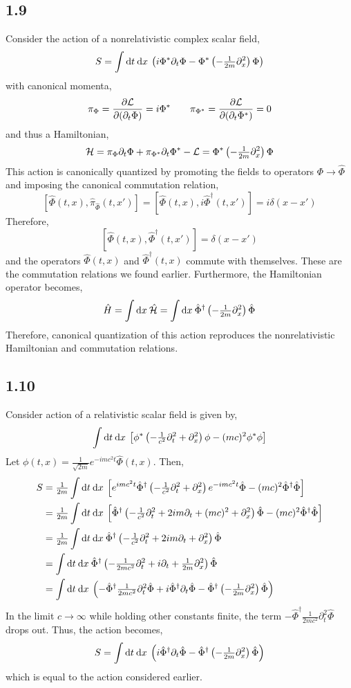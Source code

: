 \documentclass[12pt]{extarticle}
\newcommand{\field}{\hat{\Phi}}
\newcommand{\dfield}{\hat{\Phi}^\dagger}
\begin{document}
\subsection*{1.9}
Consider the action of a nonrelativistic complex scalar field,
\[ S = \int \mathrm{d}t \: \mathrm{d}x \: \left( i \Phi^* \partial_t \Phi - \Phi^* \left(-\tfrac{1}{2m} \partial_x^2 \right) \Phi \right) \] 
with canonical momenta,
\[ \pi_{\Phi} = \frac{\partial{\mathcal{L}}}{\partial{(\partial_t \Phi)}} = i \Phi^* \quad \quad \pi_{\Phi^*} = \frac{\partial{\mathcal{L}}}{\partial{(\partial_t \Phi^*)}} = 0 \]
and thus a Hamiltonian,
\[ \mathcal{H} = \pi_\Phi \partial_t \Phi + \pi_{\Phi^*} \partial_t \Phi^* - \mathcal{L} = \Phi^* \left(-\tfrac{1}{2m} \partial_x^2 \right) \Phi\]
This action is canonically quantized by promoting the fields to operators $\Phi \to \field$ and imposing the canonical commutation relation,
\[ [ \field(t, x), \hat{\pi}_{\field}(t, x')] = [\field(t, x), i\dfield(t, x')] = i \delta(x - x')\] 
Therefore,
\[ [\field(t, x), \dfield(t, x')] = \delta(x - x')\]
and the operators $\field(t, x)$ and $\dfield(t, x)$ commute with themselves. These are the commutation relations we found earlier. Furthermore, the Hamiltonian operator becomes,
\[ \hamilt = \int \d{x} \hat{\mathcal{H}} = \int \d{x} \dfield \left(-\tfrac{1}{2m} \partial_x^2 \right) \field \]
Therefore, canonical quantization of this action reproduces the nonrelativistic Hamiltonian and commutation relations. 
\subsection*{1.10}
Consider action of a relativistic scalar field is given by,
\[ \int \mathrm{d}t \: \mathrm{d}x \: \left[ \phi^* \left( - \tfrac{1}{c^2} \partial_t^2 + \partial_x^2 \right) \phi - (mc)^2 \phi^* \phi \right] \]
Let $\phi(t, x) = \tfrac{1}{\sqrt{2m}} e^{- i m c^2 t}\field(t, x)$. Then,
\begin{align*}
S & = \tfrac{1}{2m} \int \d{t} \d{x} \left[ e^{i m c^2 t} \dfield \left( - \tfrac{1}{c^2} \partial_t^2 + \partial_x^2 \right) e^{- i m c^2 t} \field - (mc)^2 \dfield \field \right]
\\
& = \tfrac{1}{2m} \int \d{t} \d{x} \left[ \dfield \left( - \tfrac{1}{c^2} \partial_t^2 + 2 i m \partial_t + (mc)^2 +  \partial_x^2 \right) \field - (mc)^2 \dfield \field \right]
\\
& = \tfrac{1}{2m} \int \d{t} \d{x} \dfield \left( - \tfrac{1}{c^2} \partial_t^2 + 2 i m \partial_t + \partial_x^2 \right) \field
\\
& = \int \d{t} \d{x} \dfield \left( - \tfrac{1}{2 m c^2} \partial_t^2 + i \partial_t + \tfrac{1}{2m} \partial_x^2 \right) \field
\\
& = \int \d{t} \d{x} \left( - \dfield \tfrac{1}{2 m c^2} \partial_t^2 \field + i \dfield  \partial_t \field - \dfield \left( - \tfrac{1}{2m} \partial_x^2 \right) \field \right)
\end{align*}
In the limit $c \to \infty$ while holding other constants finite, the term $- \dfield \tfrac{1}{2 m c^2} \partial_t^2 \field$ drops out. Thus, the action becomes,
\[ S =  \int \d{t} \d{x} \left( i \dfield  \partial_t \field - \dfield \left( - \tfrac{1}{2m} \partial_x^2 \right) \field \right)\]
which is equal to the action considered earlier. 
\end{document}

